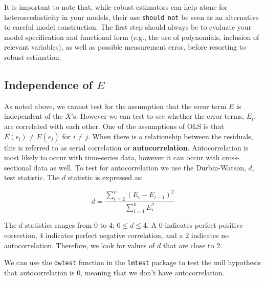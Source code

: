 \documentclass[11pt,openany]{book}\usepackage[]{graphicx}\usepackage[]{color}
\begin{document}
It is important to note that, while robust estimators can help atone for heteroscedasticity in your models, their use \texttt{should not} be seen as an alternative to careful model construction. The first step should always be to evaluate your model specification and functional form (e.g., the use of polynomials, inclusion of relevant variables), as well as possible measurement error, before resorting to robust estimation.

\subsection{Independence of $E$} 

As noted above, we cannot test for the assumption that the error term $E$ is independent of the $X$'s.  However we can test to see whether the error terms, $E_i$, are correlated with each other. One of the assumptions of OLS is that   $E(\epsilon_i) \neq E(\epsilon_j)$ for $i \neq j$. When there is a relationship between the residuals, this is referred to as serial correlation or \textbf{autocorrelation}. Autocorrelation is most likely to occur with time-series data, however it can occur with cross-sectional data as well. To test for autocorrelation we use the Durbin-Watson, $d$, test statistic. The $d$ statistic is expressed as:

\begin{equation}
  \label{eq:dw}
  d = \frac{\sum_{i=2}^{n} (E_i-E_{i-1})^{2}}{\sum_{i=1}^{n} E^{2}_i}
\end{equation}

The $d$ statistics ranges from $0$ to $4$; $0 \leq d \leq 4$. A  $0$ indicates perfect positive correction, $4$ indicates perfect negative correlation, and a $2$ indicates no autocorrelation. Therefore, we look for values of $d$ that are close to $2$.  

We can use the \texttt{dwtest} function in the \texttt{lmtest} package to test the null hypothesis that autocorrelation is $0$, meaning that we don't have autocorrelation. 
\end{document}

